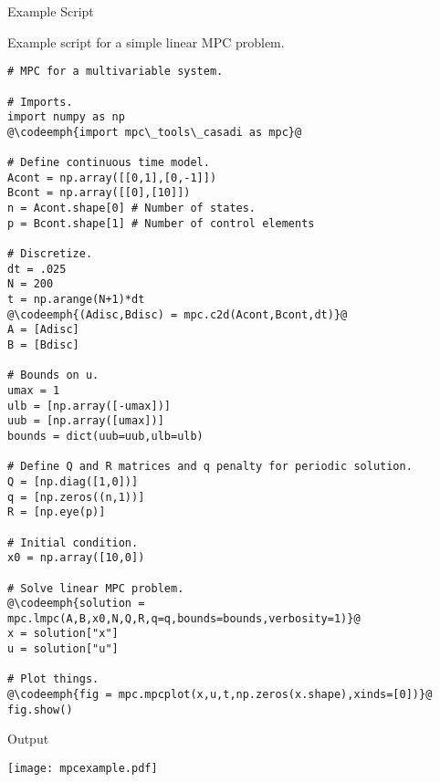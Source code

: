 \documentclass[xcolor=dvipsnames]{beamer}
\newcommand{\codeemph}[1]{\textcolor{NavyBlue}{\small\bfseries #1}}
\begin{document}
\begin{frame}{Example Script}

Example script for a simple linear MPC problem.

\begin{lstlisting}[style=python,basicstyle=\ttfamily\fontsize{8}{10}\selectfont]
# MPC for a multivariable system.

# Imports.
import numpy as np
@\codeemph{import mpc\_tools\_casadi as mpc}@

# Define continuous time model.
Acont = np.array([[0,1],[0,-1]])
Bcont = np.array([[0],[10]])
n = Acont.shape[0] # Number of states.
p = Bcont.shape[1] # Number of control elements

# Discretize.
dt = .025
N = 200
t = np.arange(N+1)*dt
@\codeemph{(Adisc,Bdisc) = mpc.c2d(Acont,Bcont,dt)}@
A = [Adisc]
B = [Bdisc]

# Bounds on u.
umax = 1
ulb = [np.array([-umax])]
uub = [np.array([umax])]
bounds = dict(uub=uub,ulb=ulb)

# Define Q and R matrices and q penalty for periodic solution.
Q = [np.diag([1,0])]
q = [np.zeros((n,1))]
R = [np.eye(p)]

# Initial condition.
x0 = np.array([10,0])

# Solve linear MPC problem.
@\codeemph{solution = mpc.lmpc(A,B,x0,N,Q,R,q=q,bounds=bounds,verbosity=1)}@
x = solution["x"]
u = solution["u"]

# Plot things.
@\codeemph{fig = mpc.mpcplot(x,u,t,np.zeros(x.shape),xinds=[0])}@
fig.show()
\end{lstlisting}

\end{frame}

\begin{frame}{Output}
\begin{center}
    \texttt{[image: mpcexample.pdf]}
\end{center}
\end{frame}
\end{document}
